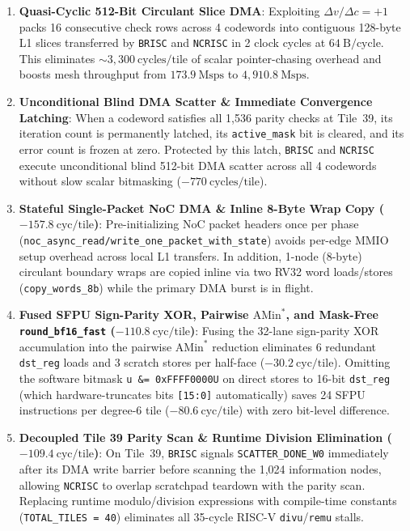 \documentclass[10pt]{article}
\begin{document}
\begin{enumerate}[leftmargin=1.8em, itemsep=3pt]
    \item \textbf{Quasi-Cyclic 512-Bit Circulant Slice DMA}: Exploiting $\Delta v / \Delta c = +1$ packs 16 consecutive check rows across 4 codewords into contiguous 128-byte L1 slices transferred by \texttt{BRISC} and \texttt{NCRISC} in 2 clock cycles at $64\ \mathrm{B/cycle}$. This eliminates $\sim 3,300\ \mathrm{cycles/tile}$ of scalar pointer-chasing overhead and boosts mesh throughput from $173.9\ \mathrm{Msps}$ to $4,910.8\ \mathrm{Msps}$.
    \item \textbf{Unconditional Blind DMA Scatter \& Immediate Convergence Latching}: When a codeword satisfies all 1,536 parity checks at Tile~39, its iteration count is permanently latched, its \texttt{active\_mask} bit is cleared, and its error count is frozen at zero. Protected by this latch, \texttt{BRISC} and \texttt{NCRISC} execute unconditional blind 512-bit DMA scatter across all 4 codewords without slow scalar bitmasking ($-770\ \mathrm{cycles/tile}$).
    \item \textbf{Stateful Single-Packet NoC DMA \& Inline 8-Byte Wrap Copy ($-157.8\ \mathrm{cyc/tile}$)}: Pre-initializing NoC packet headers once per phase (\texttt{noc\_async\_read/write\_one\_packet\_with\_state}) avoids per-edge MMIO setup overhead across local L1 transfers. In addition, 1-node ($8\text{-byte}$) circulant boundary wraps are copied inline via two RV32 word loads/stores (\texttt{copy\_words\_8b}) while the primary DMA burst is in flight.
    \item \textbf{Fused SFPU Sign-Parity XOR, Pairwise $\mathrm{AMin}^*$, and Mask-Free \texttt{round\_bf16\_fast} ($-110.8\ \mathrm{cyc/tile}$)}: Fusing the 32-lane sign-parity XOR accumulation into the pairwise $\mathrm{AMin}^*$ reduction eliminates 6 redundant \texttt{dst\_reg} loads and 3 scratch stores per half-face ($-30.2\ \mathrm{cyc/tile}$). Omitting the software bitmask \texttt{u \&= 0xFFFF0000U} on direct stores to 16-bit \texttt{dst\_reg} (which hardware-truncates bits \texttt{[15:0]} automatically) saves 24 SFPU instructions per degree-6 tile ($-80.6\ \mathrm{cyc/tile}$) with zero bit-level difference.
    \item \textbf{Decoupled Tile 39 Parity Scan \& Runtime Division Elimination ($-109.4\ \mathrm{cyc/tile}$)}: On Tile~39, \texttt{BRISC} signals \texttt{SCATTER\_DONE\_W0} immediately after its DMA write barrier before scanning the 1,024 information nodes, allowing \texttt{NCRISC} to overlap scratchpad teardown with the parity scan. Replacing runtime modulo/division expressions with compile-time constants (\texttt{TOTAL\_TILES = 40}) eliminates all 35-cycle RISC-V \texttt{divu}/\texttt{remu} stalls.

\end{enumerate}
\end{document}
